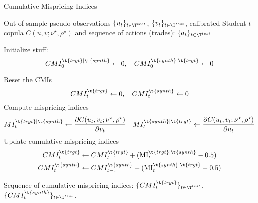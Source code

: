 \begin{algorithm}[H]
\label{alg:calibrating_student-t}
\caption{Cumulative Mispricing Indices}
\begin{algorithmic}[1]
\Require Out-of-sample pseudo observations 
$\{u_t\}_{t\in\T^{test}}$, $\{v_t\}_{t\in\T^{test}}$, calibrated Student-$t$ copula $C(u,v; \nu^\star, \rho^\star)$ and sequence of actions (trades): $\{a_t\}_{t\in\T^{test}}$

\State Initialize stuff: 
$$\displaystyle
CMI_0^{\t{trgt}|\t{synth}} \gets 0, \quad 
CMI_0^{\t{synth}|\t{trgt}} \gets 0
$$

        \State Reset the CMIs
        $$
        CMI_t^{\t{trgt}} \gets 0, \quad 
        CMI_t^{\t{synth}} \gets 0
        $$
    \Else
    	\State Compute mispricing indices
$$
MI_t^{\t{trgt}|\t{synth}} \gets \dfrac{\partial C(u_t, v_t; \nu^\star, \rho^\star)}{\partial v_t}
\quad 
MI_t^{\t{synth}|\t{trgt}} \gets \dfrac{\partial C(u_t, v_t; \nu^\star, \rho^\star)}{\partial u_t}
$$
        \State Update cumulative mispricing indices
        \begin{align*}
        CMI_t^{\t{trgt}} &\gets CMI_{t-1}^{\t{trgt}} + (\text{MI}_t^{\t{trgt}|\t{synth}} - 0.5) \\ 
        CMI_t^{\t{synth}} &\gets CMI_{t-1}^{\t{synth}} + (\text{MI}_t^{\t{synth}|\t{trgt}} - 0.5)
        \end{align*}
    \EndIf

\EndFor

\Ensure Sequence of cumulative mispricing indices: $\{CMI_t^{\t{trgt}}\}_{t\in\T^{test}}$, $\{CMI_t^{\t{synth}}\}_{t\in\T^{test}}$.

\end{algorithmic}
\end{algorithm}


